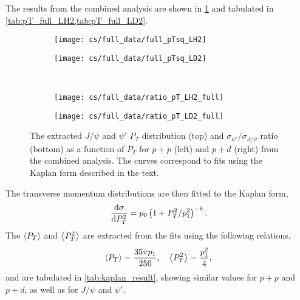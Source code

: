 \documentclass[../main.tex]{subfiles}
\begin{document}
The results from the combined analysis are shown in \cref{fig:pT_combined} and tabulated in \cref{tab:pT_full_LH2,tab:pT_full_LD2}.
\begin{figure}[h!]
	\centering
	\begin{subfigure}{0.48\linewidth}
		\texttt{[image: cs/full\_data/full\_pTsq\_LH2]}
	\end{subfigure}
	\begin{subfigure}{0.48\linewidth}
		\texttt{[image: cs/full\_data/full\_pTsq\_LD2]}
	\end{subfigure}
	\\
	\begin{subfigure}{0.48\linewidth}
		\texttt{[image: cs/full\_data/ratio\_pT\_LH2\_full]}
	\end{subfigure}
	\begin{subfigure}{0.48\linewidth}
		\texttt{[image: cs/full\_data/ratio\_pT\_LD2\_full]}
	\end{subfigure}
	\caption{The extracted $J/\psi$ and $\psi'$ $P_T$ distribution (top) and $\sigma_{\psi'}/\sigma_{J/\psi}$
		ratio (bottom) as a function of $P_T$ for $p+p$ (left) and $p+d$ (right) from
		the combined analysis.
		The curves correspond to fits using the Kaplan form described in the text.}
	\label{fig:pT_combined}
\end{figure}
\begin{table}[h!]
	\centering
	\caption{Cross section $d\sigma/dP^2_T$ (in \unit{\nano\barn\GeV^{-2} nucleon^{-1}}) and the
		$\sigma_{\psi'}/\sigma_{J/\psi}$ ratio for $p+p$ extracted from the combined analysis, with
		their statistical and systematic uncertainties and the $\expval{P_T}$ (in \unit{\GeV}) in each bin.}
	
	\label{tab:pT_full_LH2}
\end{table}
\begin{table}[h!]
	\centering
	\caption{Cross section $d\sigma/dP^2_T$ (in \unit{\nano\barn\GeV^{-2} nucleon^{-1}}) and the
		$\sigma_{\psi'}/\sigma_{J/\psi}$ ratio for $p+d$ extracted from the combined analysis, with
		their statistical and systematic uncertainties and the $\expval{P_T}$ (in \unit{\GeV}) in each bin.}
	
	\label{tab:pT_full_LD2}
\end{table}
The transverse momentum distributions are then fitted to the Kaplan form, 
\begin{equation}
	\dv{\sigma}{P_T^2} =p_0 \left(1+ P_T^2/p_1^2\right)^{-6}.
	\label{eq:4_2_kaplan}
\end{equation}
The $\expval{P_T}$ and $\expval{P^2_T}$ are extracted from the fits using the following relations,
\begin{equation}
	\begin{split}
		\expval{P_T} = \frac{35\pi p_1}{256}, \quad \expval{P_T^2} = \frac{p_1^2}{4},
	\end{split}
\end{equation}
and are tabulated in \cref{tab:kaplan_result}, showing similar values for $p+p$ and $p+d$,
as well as for $J/\psi$ and $\psi'$.
\end{document}

